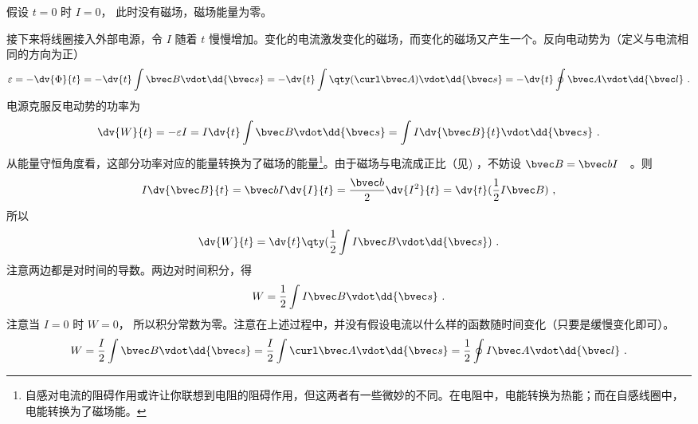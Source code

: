 假设 $t = 0$ 时 $I = 0$， 此时没有磁场，磁场能量为零。

接下来将线圈接入外部电源，令 $I$ 随着 $t$ 慢慢增加。变化的电流激发变化的磁场，而变化的磁场又产生一个。反向电动势为（定义与电流相同的方向为正）
\begin{equation}\label{eq_BEng_2}
\varepsilon  =  - \dv{\Phi}{t} =  - \dv{t} \int \bvec B \vdot \dd{\bvec s} 
=  - \dv{t} \int \qty(\curl \bvec A) \vdot \dd{\bvec s} 
=  - \dv{t} \oint \bvec A \vdot \dd{\bvec l}~.
\end{equation}
电源克服反电动势的功率为
\begin{equation}\label{eq_BEng_3}
\dv{W}{t} =  - \varepsilon I = I\dv{t} \int \bvec B \vdot \dd{\bvec s} = \int I \dv{\bvec B}{t} \vdot \dd{\bvec s}~.
\end{equation}
从能量守恒角度看，这部分功率对应的能量转换为了磁场的能量\footnote{自感对电流的阻碍作用或许让你联想到电阻的阻碍作用，但这两者有一些微妙的不同。在电阻中，电能转换为热能；而在自感线圈中，电能转换为了磁场能。}。由于磁场与电流成正比（见)
，不妨设 $\bvec B = \bvec bI$　。则
\begin{equation}\label{eq_BEng_4}
I \dv{\bvec B}{t} = \bvec bI \dv{I}{t} = \frac{\bvec b}{2} \dv{I^2}{t} = \dv{t} (\frac12 I\bvec B)~,
\end{equation}
所以
\begin{equation}\label{eq_BEng_5}
\dv{W}{t} = \dv{t} \qty(\frac12 \int I\bvec B \vdot \dd{\bvec s})~.
\end{equation}
注意两边都是对时间的导数。两边对时间积分，得
\begin{equation}\label{eq_BEng_6}
W = \frac12 \int I\bvec B \vdot \dd{\bvec s}~.
\end{equation}
注意当 $I = 0$ 时 $ W = 0$， 所以积分常数为零。注意在上述过程中，并没有假设电流以什么样的函数随时间变化（只要是缓慢变化即可）。
\begin{equation}\label{eq_BEng_7}
W = \frac{I}{2} \int \bvec B \vdot \dd{\bvec s}  = \frac{I}{2} \int \curl \bvec A \vdot \dd{\bvec s}  = \frac12 \oint I\bvec A \vdot \dd{\bvec l}~.
\end{equation}
 
